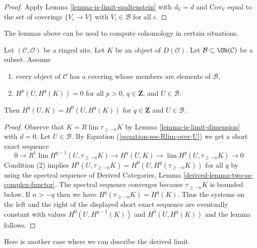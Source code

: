 \begin{proof}
Apply Lemma \ref{lemma-is-limit-spaltenstein}
with $d_V = d$ and $\text{Cov}_V$
equal to the set of coverings $\{V_i \to V\}$ with
$V_i \in \mathcal{B}$ for all $i$.
\end{proof}

\noindent
The lemmas above can be used to compute cohomology
in certain situations.

\begin{lemma}
\label{lemma-cohomology-over-U-trivial}
Let $(\mathcal{C}, \mathcal{O})$ be a ringed site. Let $K$
be an object of $D(\mathcal{O})$.
Let $\mathcal{B} \subset \Ob(\mathcal{C})$ be a subset. Assume
\begin{enumerate}
\item every object of $\mathcal{C}$ has a covering whose members are
elements of $\mathcal{B}$,
\item $H^p(U, H^q(K)) = 0$ for all $p > 0$, $q \in \mathbf{Z}$, and
$U \in \mathcal{B}$.
\end{enumerate}
Then $H^q(U, K) = H^0(U, H^q(K))$ for $q \in \mathbf{Z}$
and $U \in \mathcal{B}$.
\end{lemma}

\begin{proof}
Observe that $K = R\lim \tau_{\geq -n} K$ by
Lemma \ref{lemma-is-limit-dimension} with $d = 0$.
Let $U \in \mathcal{B}$. By Equation (\ref{equation-ses-Rlim-over-U})
we get a short exact sequence
$$
0 \to R^1\lim H^{q - 1}(U, \tau_{\geq -n}K) \to
H^q(U, K) \to \lim H^q(U, \tau_{\geq -n}K) \to 0
$$
Condition (2) implies
$H^q(U, \tau_{\geq -n} K) = H^0(U, H^q(\tau_{\geq -n} K))$
for all $q$ by using the spectral sequence of
Derived Categories, Lemma \ref{derived-lemma-two-ss-complex-functor}.
The spectral sequence converges because $\tau_{\geq -n}K$ is bounded
below. If $n > -q$ then we have $H^q(\tau_{\geq -n}K) = H^q(K)$.
Thus the systems on the left and the right of the displayed
short exact sequence are eventually constant with values
$H^0(U, H^{q - 1}(K))$ and $H^0(U, H^q(K))$ and the lemma follows.
\end{proof}

\noindent
Here is another case where we can describe the derived limit.

